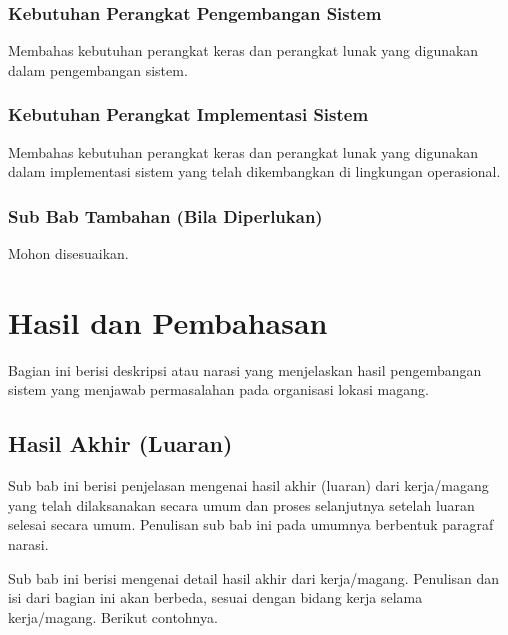 \documentclass[a4paper,11pt,oneside]{report}
\begin{document}
\subsection{Kebutuhan Perangkat Pengembangan Sistem}
Membahas kebutuhan perangkat keras dan perangkat lunak yang digunakan dalam
pengembangan sistem.

\subsection{Kebutuhan Perangkat Implementasi Sistem}
Membahas kebutuhan perangkat keras dan perangkat lunak yang digunakan dalam
implementasi sistem yang telah dikembangkan di lingkungan operasional.

\subsection{Sub Bab Tambahan (Bila Diperlukan)}
Mohon disesuaikan.

\chapter{Hasil dan Pembahasan}
Bagian ini berisi deskripsi atau narasi yang menjelaskan hasil pengembangan
sistem yang menjawab permasalahan pada organisasi lokasi magang.

\section{Hasil Akhir (Luaran)}
Sub bab ini berisi penjelasan mengenai hasil akhir (luaran) dari kerja/magang
yang telah dilaksanakan secara umum dan proses selanjutnya setelah luaran selesai
secara umum. Penulisan sub bab ini pada umumnya berbentuk paragraf narasi.

Sub bab ini berisi mengenai detail hasil akhir dari kerja/magang. Penulisan dan
isi dari bagian ini akan berbeda, sesuai dengan bidang kerja selama
kerja/magang. Berikut contohnya.
\end{document}
